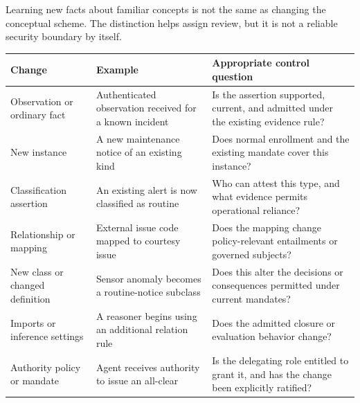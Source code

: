 \documentclass[
  english,
  12pt,
  a4paper,
  preprint,
  numbers,
  nopreprintline]{elsarticle}
\newcounter{none} %
\begin{document}
Learning new facts about familiar concepts is not the same as changing
the conceptual scheme. The distinction helps assign review, but it is
not a reliable security boundary by itself.

{\def\LTcaptype{none} %
\begin{longtable}[]{@{}
  >{\raggedright\arraybackslash}p{}
  >{\raggedright\arraybackslash}p{}
  >{\raggedright\arraybackslash}p{}@{}}
\toprule\noalign{}
\begin{minipage}[b]{\linewidth}\raggedright
Change
\end{minipage} & \begin{minipage}[b]{\linewidth}\raggedright
Example
\end{minipage} & \begin{minipage}[b]{\linewidth}\raggedright
Appropriate control question
\end{minipage} \\
\midrule\noalign{}
\endhead
\bottomrule\noalign{}
\endlastfoot
Observation or ordinary fact & Authenticated observation received for a
known incident & Is the assertion supported, current, and admitted under
the existing evidence rule? \\
New instance & A new maintenance notice of an existing kind & Does
normal enrollment and the existing mandate cover this instance? \\
Classification assertion & An existing alert is now classified as
routine & Who can attest this type, and what evidence permits
operational reliance? \\
Relationship or mapping & External issue code mapped to courtesy issue &
Does the mapping change policy-relevant entailments or governed
subjects? \\
New class or changed definition & Sensor anomaly becomes a
routine-notice subclass & Does this alter the decisions or consequences
permitted under current mandates? \\
Imports or inference settings & A reasoner begins using an additional
relation rule & Does the admitted closure or evaluation behavior
change? \\
Authority policy or mandate & Agent receives authority to issue an
all-clear & Is the delegating role entitled to grant it, and has the
change been explicitly ratified? \\
\end{longtable}
}
\end{document}
